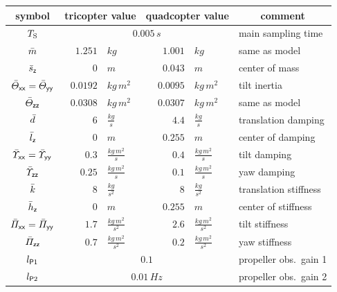 \begin{table}
 \centering
 \setlength{\tabcolsep}{.1em}
 \begin{tabular}{crlrll}
  \toprule
  \phantom{|} \quad symbol \quad\phantom{|} & \multicolumn{2}{c}{\phantom{|} \quad tricopter value \quad\phantom{|} } & \multicolumn{2}{c}{\phantom{|} \quad quadcopter value \quad\phantom{|}} & \multicolumn{1}{c}{\phantom{|} \qquad comment \qquad\phantom{|}} \\
  \midrule
  $T_{\mathrm{S}}$  & \multicolumn{4}{c}{$0.005\,\unit{s}$} & main sampling time \\
  \midrule
  $\quad\bar{m}\quad$ & \phantom{|} \qquad$1.251$&$\unit{kg}$ & \phantom{|} \qquad$1.001$&$\unit{kg}$ & same as model \\
  $\bar{s}_{\mathsf{z}}$ & $ 0 $&$\unit{m}$ & $ 0.043$&$\unit{m}$ & center of mass \\
  $\bar{\varTheta}_{\mathsf{x}\mathsf{x}}=\bar{\varTheta}_{\mathsf{y}\mathsf{y}}$ & $0.0192$&$\unit{kg}\,\unit{m}^2$& $0.0095$&$\unit{kg}\,\unit{m}^2$ & tilt inertia \\
  $\bar{\varTheta}_{\mathsf{z}\mathsf{z}}$ & $0.0308$&$\unit{kg}\,\unit{m}^2$ & $0.0307$&$\unit{kg}\,\unit{m}^2$ & same as model 
  \\[.3ex]
  $\quad\bar{d}\quad$ & $6$&$\tfrac{\unit{kg}}{\unit{s}}$ & $4.4$&$\tfrac{\unit{kg}}{\unit{s}}$ & translation damping \\
  $\bar{l}_{\mathsf{z}}$ & $ 0 $&$\unit{m}$ & $ 0.255$&$\unit{m}$ & center of damping \\
  $\bar{\varUpsilon}_{\mathsf{x}\mathsf{x}}=\bar{\varUpsilon}_{\mathsf{y}\mathsf{y}}$ & $0.3$&$\tfrac{\unit{kg}\,\unit{m}^2}{\unit{s}}$& $0.4$&$\tfrac{\unit{kg}\,\unit{m}^2}{\unit{s}}$ & tilt damping \\
  $\bar{\varUpsilon}_{\mathsf{z}\mathsf{z}}$ & $0.25$&$\tfrac{\unit{kg}\,\unit{m}^2}{\unit{s}}$ & $0.1$&$\tfrac{\unit{kg}\,\unit{m}^2}{\unit{s}}$ & yaw damping
  \\[.3ex]
  $\quad\bar{k}\quad$ & $8$&$\tfrac{\unit{kg}}{\unit{s}^2}$ & $8$&$\tfrac{\unit{kg}}{\unit{s}^2}$ & translation stiffness \\
  $\bar{h}_{\mathsf{z}}$ & $ 0 $&$\unit{m}$ & $ 0.255$&$\unit{m}$ & center of stiffness \\
  $\bar{\varPi}_{\mathsf{x}\mathsf{x}}=\bar{\varPi}_{\mathsf{y}\mathsf{y}}$ & $1.7$&$\tfrac{\unit{kg}\,\unit{m}^2}{\unit{s}^2}$& $2.6$&$\tfrac{\unit{kg}\,\unit{m}^2}{\unit{s}^2}$ & tilt stiffness \\
  $\bar{\varPi}_{\mathsf{z}\mathsf{z}}$ & $0.7$&$\tfrac{\unit{kg}\,\unit{m}^2}{\unit{s}^2}$ & $0.2$&$\tfrac{\unit{kg}\,\unit{m}^2}{\unit{s}^2}$ & yaw stiffness \\
  \midrule
  $l_{\mathsf{P}1}$  & \multicolumn{4}{c}{$0.1$} & propeller obs.\ gain 1 \\
  $l_{\mathsf{P}2}$  & \multicolumn{4}{c}{$0.01\,\unit{Hz}$} & propeller obs.\ gain 2 \\

\end{tabular}
\end{table}
